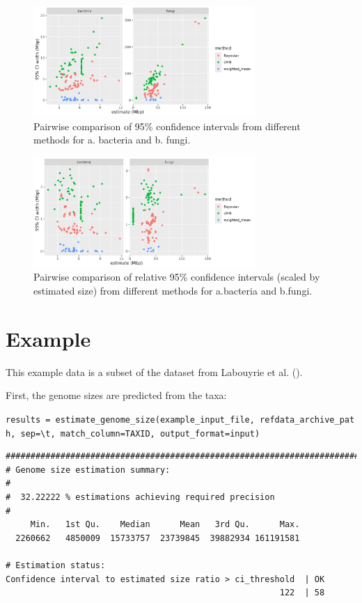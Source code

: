 \documentclass[
]{article}
\begin{document}
\begin{figure}
\centering
\includegraphics[width=0.75\textwidth,height=\textheight]{compare_CI.png}
\caption{Pairwise comparison of 95\% confidence intervals from different
methods for a. bacteria and b. fungi.\label{fig:CI_comp}}
\end{figure}

\begin{figure}
\centering
\includegraphics[width=0.75\textwidth,height=\textheight]{compare_CI_rel.png}
\caption{Pairwise comparison of relative 95\% confidence intervals
(scaled by estimated size) from different methods for a.bacteria and
b.fungi.\label{fig:CI_rel_comp}}
\end{figure}

\section{Example}\label{example}

This example data is a subset of the dataset from Labouyrie et al.
().

First, the genome sizes are predicted from the taxa:

\texttt{results\ =\ estimate\_genome\_size(example\_input\_file,\ refdata\_archive\_path,\ sep=\textquotesingle{}\textbackslash{}t\textquotesingle{},\ match\_column=\textquotesingle{}TAXID\textquotesingle{},\ output\_format=\textquotesingle{}input\textquotesingle{})}

\begin{verbatim}
#############################################################################
# Genome size estimation summary:
#
#  32.22222 % estimations achieving required precision
#
     Min.   1st Qu.    Median      Mean   3rd Qu.      Max. 
  2260662   4850009  15733757  23739845  39882934 161191581 

# Estimation status:
Confidence interval to estimated size ratio > ci_threshold  | OK 
                                                       122  | 58 
\end{verbatim}
\end{document}

